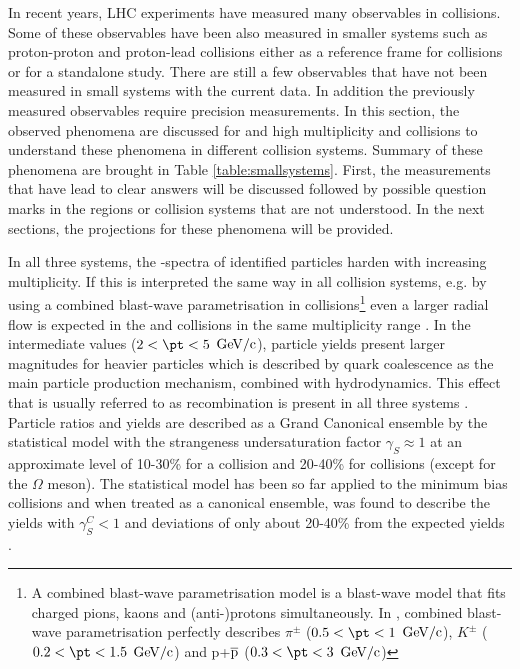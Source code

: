 \documentclass[../report.tex]{subfiles}
\begin{document}
In recent years, LHC experiments have measured many observables in \PbPb collisions. Some of these observables have been also measured in smaller systems such as proton-proton and proton-lead collisions either as a reference frame for \PbPb collisions or for a standalone study. There are still a few observables that have not been measured in small systems with the current data. In addition the previously measured observables require precision measurements. In this section, the observed phenomena are discussed for \PbPb and high multiplicity \pPb and \pp collisions to understand these phenomena in different collision systems. Summary of these phenomena are brought in Table \ref{table:smallsystems}. First, the measurements that have lead to clear answers will be discussed followed by possible question marks in the regions or collision systems that are not understood. In the next sections, the projections for these phenomena will be provided. 

In all three systems, the \pt-spectra of identified particles harden with increasing multiplicity. If this is interpreted the same way in all collision systems, e.g. by using a combined blast-wave parametrisation in \PbPb collisions\footnote{A combined blast-wave parametrisation model is a blast-wave model that fits charged pions, kaons and (anti-)protons simultaneously. In \cite{Abelev:2012wca}, combined blast-wave parametrisation perfectly describes $\pi^{\pm}$ ($ 0.5 < \pt < 1$ $\rm{GeV}/c$), $K^{\pm}$ ($ 0.2 < \pt < 1.5$ $\rm{GeV}/c$) and p+$\overline{\rm{p}}$ ($ 0.3 < \pt < 3$ $\rm{GeV}/c$)} even a larger radial flow is expected in the \pp{} and \pPb{} collisions in the same multiplicity range \cite{Shuryak:2013ke}. In the intermediate \pt{} values ($2 < \pt < 5 $ $\rm{GeV}/c$), particle yields present larger magnitudes for heavier particles which is described by quark coalescence as the main particle production mechanism, combined with hydrodynamics. This effect that is usually referred to as recombination is present in all three systems \cite{Andrei:2014vaa,Abelev:2013xaa,Abelev:2013haa,Abelev:2014uua,Khachatryan:2016yru,Adam:2015jca,Adam:2016dau,Adam:2017zbf}. Particle ratios and yields are described as a Grand Canonical ensemble by the statistical model with the strangeness undersaturation factor $\gamma_{S}\approx 1$ at an approximate level of 10-30\% for a \PbPb{} collision and 20-40\% for \pPb{} collisions (except for the $\Omega$ meson). The statistical model has been so far applied to the minimum bias \pp{} collisions and when treated as a canonical ensemble, was found to describe the yields with $\gamma^{C}_{S} < 1$ and deviations of only about 20-40\% from the expected yields \cite{Adam:2016emw,Adam:2016bpr,Adam:2015vsf,ABELEV:2013zaa}. 
\end{document}
